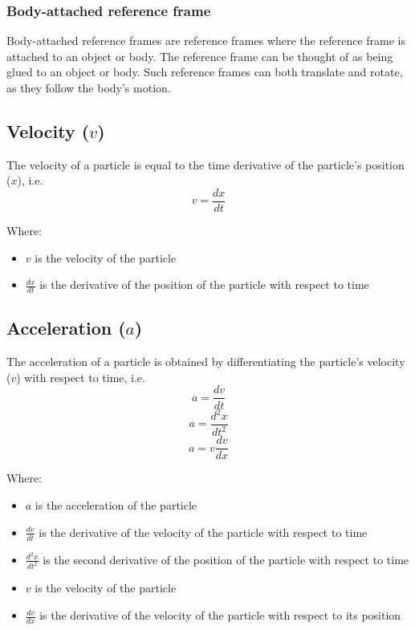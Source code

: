 \documentclass[11pt]{article}
\begin{document}
\subsubsection{Body-attached reference frame}
\label{sec:org63b9c40}
Body-attached reference frames are reference frames where the reference frame is attached to an object or body. The reference frame can be thought of as being glued to an object or body. Such reference frames can both translate and rotate, as they follow the body's motion.
\subsection{Velocity (\(v\))}
\label{sec:org5babf25}
The velocity of a particle is equal to the time derivative of the particle's position (\(x\)), i.e.
\[v = \frac{dx}{dt}\]

Where:
\begin{itemize}
\item \(v\) is the velocity of the particle
\item \(\frac{dx}{dt}\) is the derivative of the position of the particle with respect to time
\end{itemize}
\subsection{Acceleration (\(a\))}
\label{sec:org7a2097e}
The acceleration of a particle is obtained by differentiating the particle's velocity (\(v\)) with respect to time, i.e.
\[a = \frac{dv}{dt}\]
\[a = \frac{d^2x}{dt^2}\]
\[a = v \frac{dv}{dx}\]

Where:
\begin{itemize}
\item \(a\) is the acceleration of the particle
\item \(\frac{dv}{dt}\) is the derivative of the velocity of the particle with respect to time
\item \(\frac{d^2x}{dt^2}\) is the second derivative of the position of the particle with respect to time
\item \(v\) is the velocity of the particle
\item \(\frac{dv}{dx}\) is the derivative of the velocity of the particle with respect to its position
\end{itemize}
\end{document}
